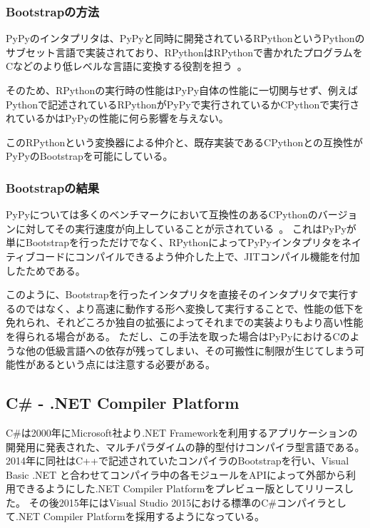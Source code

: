 \subsubsection{Bootstrapの方法}

PyPyのインタプリタは、PyPyと同時に開発されているRPythonというPythonのサブセット言語で実装されており、RPythonはRPythonで書かれたプログラムをCなどのより低レベルな言語に変換する役割を担う~\cite{rpython-doc}。

そのため、RPythonの実行時の性能はPyPy自体の性能に一切関与せず、例えばPythonで記述されているRPythonがPyPyで実行されているかCPythonで実行されているかはPyPyの性能に何ら影響を与えない。

このRPythonという変換器による仲介と、既存実装であるCPythonとの互換性がPyPyのBootstrapを可能にしている。


\subsubsection{Bootstrapの結果}

PyPyについては多くのベンチマークにおいて互換性のあるCPythonのバージョンに対してその実行速度が向上していることが示されている~\cite{speed-pypy-org}。
これはPyPyが単にBootstrapを行っただけでなく、RPythonによってPyPyインタプリタをネイティブコードにコンパイルできるよう仲介した上で、JITコンパイル機能を付加したためである。

このように、Bootstrapを行ったインタプリタを直接そのインタプリタで実行するのではなく、より高速に動作する形へ変換して実行することで、性能の低下を免れられ、それどころか独自の拡張によってそれまでの実装よりもより高い性能を得られる場合がある。
ただし、この手法を取った場合はPyPyにおけるCのような他の低級言語への依存が残ってしまい、その可搬性に制限が生じてしまう可能性があるという点には注意する必要がある。


\subsection{C\# - .NET Compiler Platform}
\label{side-effect:instance:csharp}

C\#は2000年にMicrosoft社より.NET Frameworkを利用するアプリケーションの開発用に発表された、マルチパラダイムの静的型付けコンパイラ型言語である。
2014年に同社はC++で記述されていたコンパイラのBootstrapを行い、Visual Basic .NET と合わせてコンパイラ中の各モジュールをAPIによって外部から利用できるようにした.NET Compiler Platformをプレビュー版としてリリースした。
その後2015年にはVisual Studio 2015における標準のC\#コンパイラとして.NET Compiler Platformを採用するようになっている。

